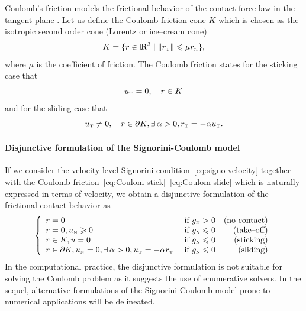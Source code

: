 Coulomb's friction  models the frictional behavior of the contact force law in the tangent plane . Let us define the Coulomb friction  cone $K$ which is chosen as the isotropic second order cone (Lorentz or ice--cream cone)
\begin{equation}
  \label{eq:CoulombCone}
  K = \{r \in \RR^3 \mid \|r_\t\| \leq \mu r_n\},
\end{equation}
where $\mu$ is the coefficient of friction. The Coulomb friction  states for the sticking case that 
\begin{equation}
  \label{eq:Coulom-stick}
  u_{\t} =0,\quad r \in K
\end{equation}
and for the sliding case that
\begin{equation}
  \label{eq:Coulom-slide}
  u_{\t}  \neq 0,\quad r \in \partial K, \exists\, \alpha > 0, r_\t = -\alpha u_\t.
\end{equation}

\paragraph{Disjunctive formulation of the Signorini-Coulomb model}

If we consider the velocity-level Signorini condition~\eqref{eq:signo-velocity} together with the Coulomb friction~\eqref{eq:Coulom-stick}--\eqref{eq:Coulom-slide} which is naturally expressed in terms of velocity, we obtain a disjunctive formulation of the frictional contact behavior as
\begin{equation}
  \label{eq:contact-disjunctive}
  \left\{\begin{array}{llr}
      r = 0  &\text{ if } g_{\n} > 0  & \text{(no contact)}\\
      r = 0,  u_\n \geq 0   &\text{ if } g_{\n} \leq 0 & \text{(take--off)} \\
      r \in K, u =0 &\text{ if } g_{\n} \leq 0 & \text{(sticking)}  \\
      r \in \partial K,u _\n=0,  \exists\,\alpha > 0, u_\t = -\alpha r_\t &\text{ if } g_{\n} \leq 0 & \text{(sliding)}  \\
\end{array}\right.
\end{equation}
In the computational practice, the disjunctive formulation is not suitable for  solving the Coulomb problem as it suggests the use of enumerative solvers. In the sequel, alternative formulations of the Signorini-Coulomb model prone to numerical applications will be delineated.

